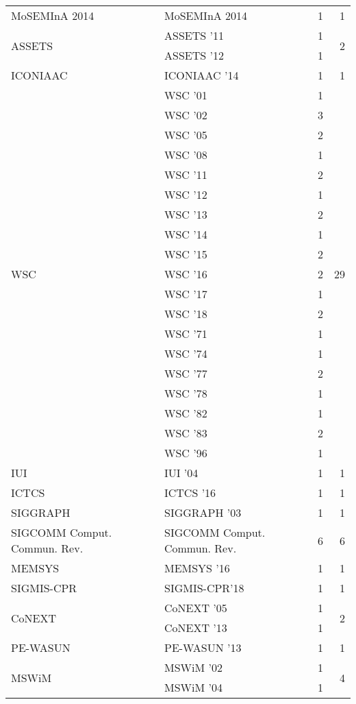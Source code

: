 \begin{table*}[t]
\begin{tabular}{llrr}
\multirow{1}{*}{MoSEMInA 2014} & MoSEMInA 2014 & 1 & \multirow{1}{*}{1}\\
\multirow{2}{*}{ASSETS } & ASSETS '11 & 1 & \multirow{2}{*}{2}\\
& ASSETS '12 & 1 &\\
\multirow{1}{*}{ICONIAAC } & ICONIAAC '14 & 1 & \multirow{1}{*}{1}\\
\multirow{19}{*}{WSC } & WSC '01 & 1 & \multirow{19}{*}{29}\\
& WSC '02 & 3 &\\
& WSC '05 & 2 &\\
& WSC '08 & 1 &\\
& WSC '11 & 2 &\\
& WSC '12 & 1 &\\
& WSC '13 & 2 &\\
& WSC '14 & 1 &\\
& WSC '15 & 2 &\\
& WSC '16 & 2 &\\
& WSC '17 & 1 &\\
& WSC '18 & 2 &\\
& WSC '71 & 1 &\\
& WSC '74 & 1 &\\
& WSC '77 & 2 &\\
& WSC '78 & 1 &\\
& WSC '82 & 1 &\\
& WSC '83 & 2 &\\
& WSC '96 & 1 &\\
\multirow{1}{*}{IUI } & IUI '04 & 1 & \multirow{1}{*}{1}\\
\multirow{1}{*}{ICTCS } & ICTCS '16 & 1 & \multirow{1}{*}{1}\\
\multirow{1}{*}{SIGGRAPH } & SIGGRAPH '03 & 1 & \multirow{1}{*}{1}\\
\multirow{1}{*}{SIGCOMM Comput. Commun. Rev.} & SIGCOMM Comput. Commun. Rev. & 6 & \multirow{1}{*}{6}\\
\multirow{1}{*}{MEMSYS } & MEMSYS '16 & 1 & \multirow{1}{*}{1}\\
\multirow{1}{*}{SIGMIS-CPR} & SIGMIS-CPR'18 & 1 & \multirow{1}{*}{1}\\
\multirow{2}{*}{CoNEXT } & CoNEXT '05 & 1 & \multirow{2}{*}{2}\\
& CoNEXT '13 & 1 &\\
\multirow{1}{*}{PE-WASUN } & PE-WASUN '13 & 1 & \multirow{1}{*}{1}\\
\multirow{4}{*}{MSWiM } & MSWiM '02 & 1 & \multirow{4}{*}{4}\\
& MSWiM '04 & 1 &\\

\end{tabular}
\end{table*}

